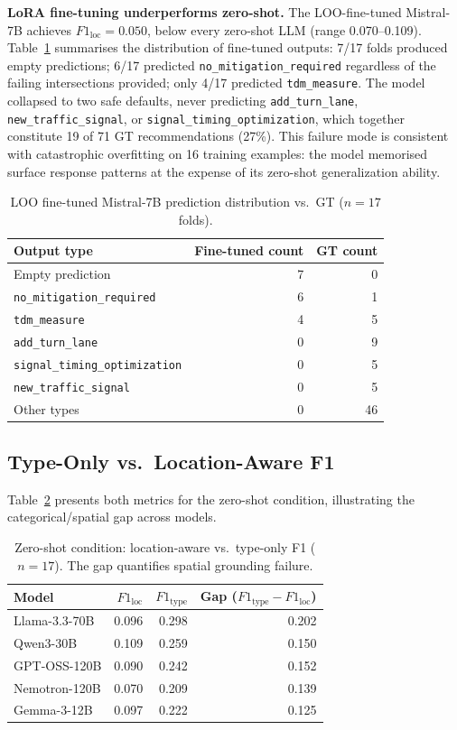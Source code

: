 \documentclass[preprint,12pt]{elsarticle}
\begin{document}
\textbf{LoRA fine-tuning underperforms zero-shot.}
The LOO-fine-tuned Mistral-7B achieves $F1_\text{loc} = 0.050$, below
every zero-shot LLM (range 0.070--0.109).
Table~\ref{tab:finetuned_outputs} summarises the distribution of
fine-tuned outputs: 7/17 folds produced empty predictions;
6/17 predicted \texttt{no\_mitigation\_required} regardless of the
failing intersections provided; only 4/17 predicted \texttt{tdm\_measure}.
The model collapsed to two safe defaults, never predicting
\texttt{add\_turn\_lane}, \texttt{new\_traffic\_signal}, or
\texttt{signal\_timing\_optimization}, which together constitute
19 of 71 GT recommendations (27\%).
This failure mode is consistent with catastrophic overfitting on 16
training examples: the model memorised surface response patterns at
the expense of its zero-shot generalization ability.

\begin{table}[h]
\centering
\caption{LOO fine-tuned Mistral-7B prediction distribution vs.\ GT ($n=17$ folds).}
\label{tab:finetuned_outputs}
\begin{tabular}{lrr}
\toprule
Output type & Fine-tuned count & GT count \\
\midrule
Empty prediction                & 7  & 0 \\
\texttt{no\_mitigation\_required} & 6  & 1 \\
\texttt{tdm\_measure}             & 4  & 5 \\
\texttt{add\_turn\_lane}          & 0  & 9 \\
\texttt{signal\_timing\_optimization} & 0 & 5 \\
\texttt{new\_traffic\_signal}     & 0  & 5 \\
Other types                     & 0  & 46 \\
\bottomrule
\end{tabular}
\end{table}

\subsection{Type-Only vs.\ Location-Aware F1}

Table~\ref{tab:type_vs_loc} presents both metrics for the zero-shot condition,
illustrating the categorical/spatial gap across models.

\begin{table}[h]
\centering
\caption{Zero-shot condition: location-aware vs.\ type-only F1 ($n=17$).
The gap quantifies spatial grounding failure.}
\label{tab:type_vs_loc}
\begin{tabular}{lrrr}
\toprule
Model & $F1_\text{loc}$ & $F1_\text{type}$ & Gap ($F1_\text{type} - F1_\text{loc}$) \\
\midrule
Llama-3.3-70B  & 0.096 & 0.298 & 0.202 \\
Qwen3-30B      & 0.109 & 0.259 & 0.150 \\
GPT-OSS-120B   & 0.090 & 0.242 & 0.152 \\
Nemotron-120B  & 0.070 & 0.209 & 0.139 \\
Gemma-3-12B    & 0.097 & 0.222 & 0.125 \\
\bottomrule
\end{tabular}
\end{table}
\end{document}
